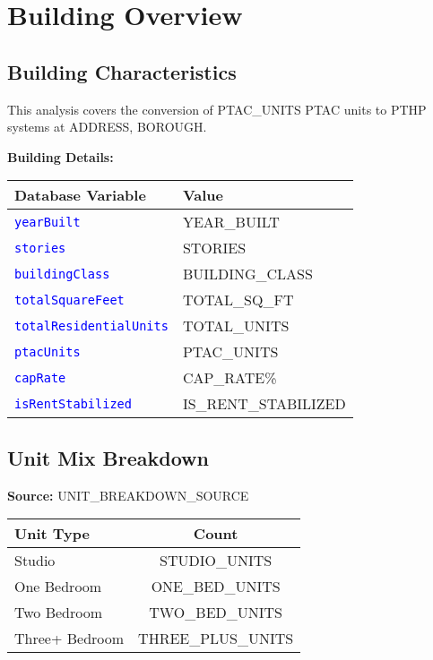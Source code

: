 \documentclass[11pt,letterpaper]{article}
\newcommand{\code}[1]{\textcolor{blue}{\texttt{#1}}}
\begin{document}
\section{Building Overview}

\subsection{Building Characteristics}
This analysis covers the conversion of {{PTAC_UNITS}} PTAC units to PTHP systems at {{ADDRESS}}, {{BOROUGH}}.

\textbf{Building Details:}
\begin{center}
\begin{tabular}{ll}
\hline
\textbf{Database Variable} & \textbf{Value} \\
\hline
\code{yearBuilt} & {{YEAR_BUILT}} \\
\code{stories} & {{STORIES}} \\
\code{buildingClass} & {{BUILDING_CLASS}} \\
\code{totalSquareFeet} & {{TOTAL_SQ_FT}} \\
\code{totalResidentialUnits} & {{TOTAL_UNITS}} \\
\code{ptacUnits} & {{PTAC_UNITS}} \\
\code{capRate} & {{CAP_RATE}}\% \\
\code{isRentStabilized} & {{IS_RENT_STABILIZED}} \\
\hline
\end{tabular}
\end{center}

\subsection{Unit Mix Breakdown}
\textbf{Source:} {{UNIT_BREAKDOWN_SOURCE}}

\begin{center}
\begin{tabular}{lc}
\hline
Unit Type & Count \\
\hline
Studio & {{STUDIO_UNITS}} \\
One Bedroom & {{ONE_BED_UNITS}} \\
Two Bedroom & {{TWO_BED_UNITS}} \\
Three+ Bedroom & {{THREE_PLUS_UNITS}} \\
\hline
\end{tabular}
\end{center}
\end{document}
